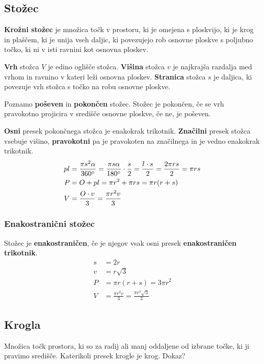 \documentclass[a4paper,oneside,12pt,fleqn]{article}
\newcommand\krat\cdot
\def\deg{\degree}
\numberwithin{equation}{section}
\begin{document}
\subsection{Stožec}
\label{sec:tel:stoz}
\textbf{Krožni stožec} je množica točk v prostoru, ki je omejena s ploskvijo, ki je krog
in plaščem, ki je unija vseh daljic, ki povezujejo rob osnovne ploskve s poljubno 
točko, ki ni v isti ravnini kot osnovna ploskev. 

\textbf{Vrh} stožca $V$ je edino oglišče stožca. \textbf{Višina} stožca $v$ je najkrajša razdalja med vrhom
in ravnino v kateri leži osnovna ploskev. \textbf{Stranica} stožca $s$ je daljica, ki povezuje vrh
stožca s točko na robu osnovne ploskve.

Poznamo \textbf{poševen} in \textbf{pokončen} stožec. Stožec je pokončen, če se vrh
pravokotno projicira v središče osnovne ploskve, če ne, je poševen. 

\textbf{Osni} presek pokončnega stožca je enakokrak trikotnik.
\textbf{Značilni} presek stožca vsebuje višino, \textbf{pravokotni} pa je pravokoten na značilnega in je
vedno enakokrak trikotnik.
\begin{align*}
  pl &= \frac{\pi s^2\alpha}{360\deg} = \frac{\pi s\alpha}{180\deg} \krat
  \frac{s}{2} = \frac{l \krat s}{2} = \frac{2\pi rs}{2} = \pi rs \\
  P &= O + pl = \pi r^2 + \pi rs = \pi r(r+s) \\
  V &= \frac{O\krat v}{3} = \frac{\pi r^2v}{3}
\end{align*}

\subsubsection{Enakostranični stožec}
\label{sec:tel:stoz:enak}
Stožec je \textbf{enakostraničen}, če je njegov vsak osni
presek \textbf{enakostraničen trikotnik}.
\begin{align*}
  s &= 2r \\
  v &= r\sqrt{3} \\
  P &= \pi r(r+s) = 3\pi r^2 \\
  V &= \frac{\pi r^2v}{3} = \frac{\pi r^3\sqrt{3}}{3}
\end{align*}

\subsection{Krogla}
\label{sec:tel:krog}
Množica točk prostora, ki so za radij ali manj oddaljene od izbrane točke, ki ji pravimo
središče. Katerikoli presek krogle je krog. Dokaz?
\end{document}

